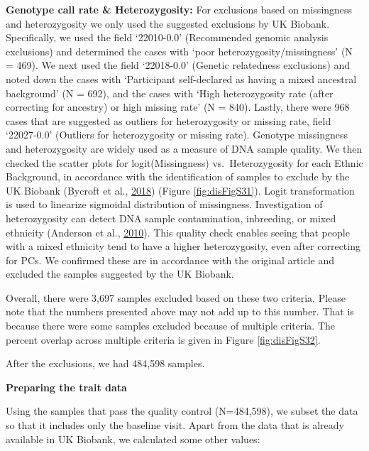 \documentclass[12pt,twoside]{unicam}
\begin{document}
\textbf{Genotype call rate \& Heterozygosity:} For exclusions based on missingness and heterozygosity we only used the suggested exclusions by UK Biobank. Specifically, we used the field `22010-0.0' (Recommended genomic analysis exclusions) and determined the cases with `poor heterozygosity/missingness' (N = 469). We next used the field `22018-0.0' (Genetic relatedness exclusions) and noted down the cases with `Participant self-declared as having a mixed ancestral background' (N = 692), and the cases with `High heterozygosity rate (after correcting for ancestry) or high missing rate' (N = 840). Lastly, there were 968 cases that are suggested as outliers for heterozygosity or missing rate, field `22027-0.0' (Outliers for heterozygosity or missing rate). Genotype missingness and heterozygosity are widely used as a measure of DNA sample quality. We then checked the scatter plots for logit(Missingness) vs.~Heterozygosity for each Ethnic Background, in accordance with the identification of samples to exclude by the UK Biobank (Bycroft et al., \protect\hyperlink{ref-Bycroft2018}{2018}) (Figure \ref{fig:disFigS31}). Logit transformation is used to linearize sigmoidal distribution of missingness. Investigation of heterozygosity can detect DNA sample contamination, inbreeding, or mixed ethnicity (Anderson et al., \protect\hyperlink{ref-Anderson2010}{2010}). This quality check enables seeing that people with a mixed ethnicity tend to have a higher heterozygosity, even after correcting for PCs. We confirmed these are in accordance with the original article and excluded the samples suggested by the UK Biobank.

Overall, there were 3,697 samples excluded based on these two criteria. Please note that the numbers presented above may not add up to this number. That is because there were some samples excluded because of multiple criteria. The percent overlap across multiple criteria is given in Figure \ref{fig:disFigS32}.

After the exclusions, we had 484,598 samples.

\textbf{Preparing the trait data}

Using the samples that pass the quality control (N=484,598), we subset the data so that it includes only the baseline visit. Apart from the data that is already available in UK Biobank, we calculated some other values:
\end{document}
